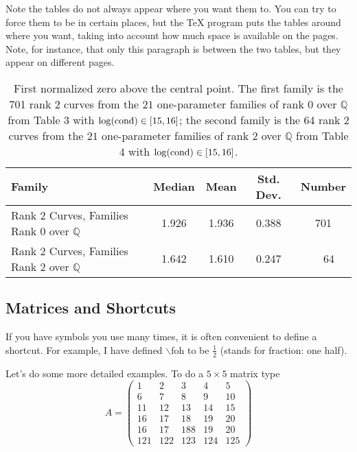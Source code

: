 \documentclass[12pt,reqno]{amsart}
\newcommand{\Q}{\mathbb{Q}}
\numberwithin{equation}{section}
\begin{document}
Note the tables do not always appear where you want them to. You can
try to force them to be in certain places, but the TeX program puts
the tables around where you want, taking into account how much space
is available on the pages. Note, for instance, that only this
paragraph is between the two tables, but they appear on different
pages.



\begin{table}
\begin{center}
\begin{tabular}{|l||c|c|c|c|}
  \hline
\textbf{Family} & \textbf{Median} & \textbf{Mean} & \textbf{Std.
Dev.} & \textbf{Number} \\ \hline
Rank 2 Curves, Families Rank 0 over $\Q$ & 1.926 & 1.936 & 0.388 & 701 \\
Rank 2 Curves, Families Rank 2 over $\Q$ & 1.642 & 1.610 & 0.247 & \ \ 64 \\
\hline
\end{tabular}
\caption{First normalized zero above the central point. The first
family is the 701 rank $2$ curves from the $21$ one-parameter
families of rank $0$ over $\Q$ from Table 3 with $\log({\rm cond})
\in [15,16]$; the second family is the 64 rank $2$ curves from the
$21$ one-parameter families of rank $2$ over $\Q$ from Table $4$
with $\log({\rm cond}) \in [15,16]$.} \label{tab:2comparisons}
\end{center}
\end{table}




\subsection{Matrices and Shortcuts}

If you have symbols you use many times, it is often convenient to
define a shortcut. For example, I have defined $\backslash$foh to
be $\frac{1}{2}$ (stands for fraction: one half).

Let's do some more detailed examples. To do a $5 \times 5$ matrix
type
\begin{equation}
A =  \left( \begin{array}{ccccc}
                        1  & 2  & 3  & 4  & 5  \\
                        6  & 7  & 8  & 9  & 10 \\
                        11 & 12 & 13 & 14 & 15 \\
                        16 & 17 & 18 & 19 & 20 \\
                        16 & 17 & 188 & 19 & 20 \\
                        121 & 122 & 123 & 124 & 125
                          \end{array}\right)
\end{equation}
\end{document}
